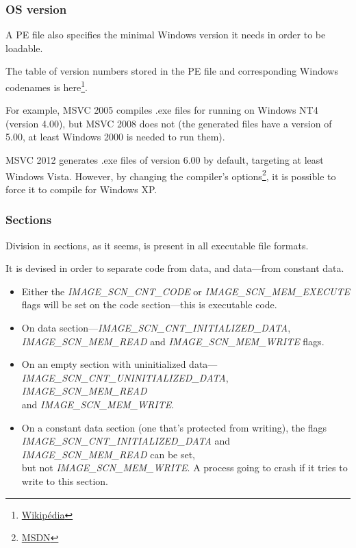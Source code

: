 \subsubsection{OS version}

A PE file also specifies the minimal Windows version it needs in order to be loadable.

The table of version numbers stored in the PE file and corresponding Windows codenames is
here\footnote{\href{https://en.wikipedia.org/wiki/Windows_NT#Releases}{Wikipédia}}.

For example, \ac{MSVC} 2005 compiles .exe files for running on Windows NT4 (version 4.00), but \ac{MSVC} 2008 does not
(the generated files have a version of 5.00, at least Windows 2000 is needed to run them).


\ac{MSVC} 2012 generates .exe files of version 6.00 by default,
targeting at least Windows Vista.
However, by changing the compiler's options\footnote{\href{http://blogs.msdn.com/b/vcblog/archive/2012/10/08/10357555.aspx}{MSDN}},
it is possible to force it to compile for Windows XP.

\subsubsection{Sections}

Division in sections, as it seems, is present in all executable file formats.

It is devised in order to separate code from data, and data---from constant data.

\begin{itemize}
\item Either the \emph{IMAGE\_SCN\_CNT\_CODE} or \emph{IMAGE\_SCN\_MEM\_EXECUTE} flags will be set on the code section---this is executable code.

\item On data section---\emph{IMAGE\_SCN\_CNT\_INITIALIZED\_DATA},\\
\emph{IMAGE\_SCN\_MEM\_READ} and \emph{IMAGE\_SCN\_MEM\_WRITE} flags.

\item On an empty section with uninitialized data---\\
\emph{IMAGE\_SCN\_CNT\_UNINITIALIZED\_DATA}, \emph{IMAGE\_SCN\_MEM\_READ} \\
        and \emph{IMAGE\_SCN\_MEM\_WRITE}.

\item On a constant data section (one that's protected from writing), the flags \\
\emph{IMAGE\_SCN\_CNT\_INITIALIZED\_DATA} and \emph{IMAGE\_SCN\_MEM\_READ} can be set, \\
but not \emph{IMAGE\_SCN\_MEM\_WRITE}.
A process going to crash if it tries to write to this section.
\end{itemize}

